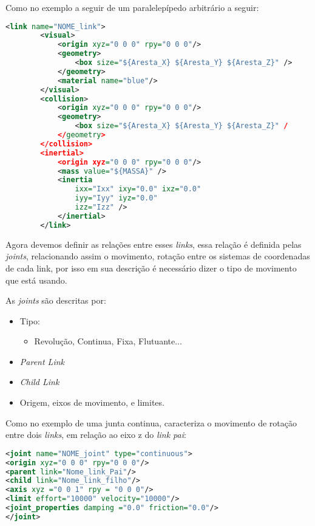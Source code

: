 Como no exemplo a seguir de um paralelepípedo arbitrário a seguir:

\begin{lstlisting}[language=XML,caption={XML version}]
    <link name="NOME_link">
        <visual>
            <origin xyz="0 0 0" rpy="0 0 0"/>
            <geometry>
                <box size="${Aresta_X} ${Aresta_Y} ${Aresta_Z}" />
            </geometry>
            <material name="blue"/>
        </visual>
        <collision>
            <origin xyz="0 0 0" rpy="0 0 0"/>
            <geometry>
                <box size="${Aresta_X} ${Aresta_Y} ${Aresta_Z}" /
            </geometry>
        </collision>
        <inertial>
            <origin xyz="0 0 0" rpy="0 0 0"/>
            <mass value="${MASSA}" />
            <inertia
                ixx="Ixx" ixy="0.0" ixz="0.0"
                iyy="Iyy" iyz="0.0"
                izz="Izz" />
            </inertial>
        </link>
\end{lstlisting}


Agora devemos definir as relações entre esses \textit{links}, essa relação é definida pelas \textit{joints}, relacionando assim o movimento, rotação entre os sistemas de coordenadas de cada link, por isso em sua descrição é necessário dizer o tipo de movimento que está usando.

As \textit{joints} são descritas por:

\begin{itemize}
    \item Tipo:
    \begin{itemize}
        \item Revolução, Continua, Fixa, Flutuante...
    \end{itemize}
    \item \textit{Parent Link}
    \item \textit{Child Link}
    \item Origem, eixos de movimento, e limites.
\end{itemize}

Como no exemplo de uma junta continua, caracteriza o movimento de rotação entre dois \textit{links}, em relação ao eixo z do \textit{link pai}:

\begin{lstlisting}[language=XML,caption={XML version}]
<joint name="NOME_joint" type="continuous">
<origin xyz="0 0 0" rpy="0 0 0"/>
<parent link="Nome_link_Pai"/>
<child link="Nome_link_filho"/>
<axis xyz ="0 0 1" rpy = "0 0 0"/>
<limit effort="10000" velocity="10000"/>
<joint_properties damping ="0.0" friction="0.0"/>
</joint>
\end{lstlisting}

